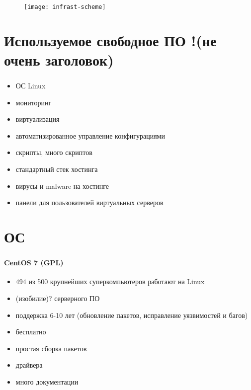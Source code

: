 \begin{frame}
\frametitle{\insertsection}
\begin{figure}[h]
	\begin{center}
		\texttt{[image: infrast-scheme]}
	\end{center}
\end{figure}
\end{frame}


\section{Используемое свободное ПО !(не очень заголовок)}

\begin{frame}
\frametitle{\insertsection}
\begin{itemize}
	\item ОС Linux
	\item мониторинг
	\item виртуализация
	\item автоматизированное управление конфигурациями
	\item скрипты, много скриптов
	\item стандартный стек хостинга
	\item вирусы и malware на хостинге
	\item панели для пользователей виртуальных серверов
\end{itemize}
\end{frame}


\section{ОС}

\begin{frame}
\frametitle{\insertsection}
\framesubtitle{CentOS 7 (GPL)}
\begin{itemize}
	\item 494 из 500 крупнейших суперкомпьютеров работают на Linux
	\item (изобилие)? серверного ПО
	\item поддержка 6-10 лет (обновление пакетов, исправление уязвимостей и багов)
	\item бесплатно
	\item простая сборка пакетов
	\item драйвера
	\item много документации
\end{itemize}
\end{frame}

